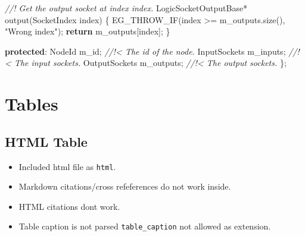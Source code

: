 \documentclass[
  12pt,
  british,
  paper=a4,
  twoside,
  titlepage=true,
  openright,
  abstract=on,
  toc=listofnumbered,
  numbers=noenddot,
  chapterprefix=true,
  headings=optiontohead,
  svgnames,
  dvipsnames]{scrreprt}
\newenvironment{Shaded}{}{}
\newcommand{\CommentTok}[1]{\textcolor[rgb]{0.38,0.63,0.69}{\textit{#1}}}
\newcommand{\ControlFlowTok}[1]{\textcolor[rgb]{0.00,0.44,0.13}{\textbf{#1}}}
\newcommand{\KeywordTok}[1]{\textcolor[rgb]{0.00,0.44,0.13}{\textbf{#1}}}
\newcommand{\NormalTok}[1]{#1}
\newcommand{\StringTok}[1]{\textcolor[rgb]{0.25,0.44,0.63}{#1}}
\newcommand{\VariableTok}[1]{\textcolor[rgb]{0.10,0.09,0.49}{#1}}
\providecommand{\tightlist}{%
  \setlength{\itemsep}{0pt}\setlength{\parskip}{0pt}}
\begin{document}
\begin{Shaded}
\begin{Highlighting}[numbers=left,,]
    \CommentTok{//! Get the output socket at index \textasciigrave{}index\textasciigrave{}.}
\NormalTok{    LogicSocketOutputBase* output(SocketIndex index)}
\NormalTok{    \{}
\NormalTok{        EG\_THROW\_IF(index \textgreater{}= }\VariableTok{m\_outputs}\NormalTok{.size(), }\StringTok{"Wrong index"}\NormalTok{);}
        \ControlFlowTok{return} \VariableTok{m\_outputs}\NormalTok{[index];}
\NormalTok{    \}}

\KeywordTok{protected}\NormalTok{:}
\NormalTok{    NodeId }\VariableTok{m\_id}\NormalTok{;              }\CommentTok{//!\textless{} The id of the node.}
\NormalTok{    InputSockets }\VariableTok{m\_inputs}\NormalTok{;    }\CommentTok{//!\textless{} The input sockets.}
\NormalTok{    OutputSockets }\VariableTok{m\_outputs}\NormalTok{;  }\CommentTok{//!\textless{} The output sockets.}
\NormalTok{\};}
\end{Highlighting}
\end{Shaded}

\hypertarget{tables}{%
\section{Tables}\label{tables}}

\hypertarget{html-table}{%
\subsection{HTML Table}\label{html-table}}

\begin{itemize}
\tightlist
\item
  Included html file as \texttt{html}.
\item
  Markdown citations/cross refeferences do not work inside.
\item
  HTML citations dont work.
\item
  Table caption is not parsed \texttt{table\_caption} not allowed as
  extension.
\end{itemize}
\end{document}

